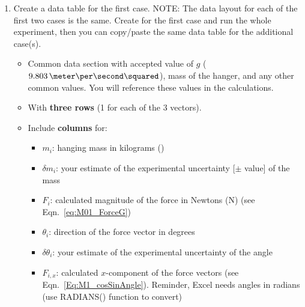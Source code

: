 \begin{enumerate}
\item Create a data table for the first case. NOTE: The data layout for each of the first two cases is the same. Create for the first case and run the whole experiment, then you can copy/paste the same data table for the additional case(s).
\begin{itemize}
    \item Common data section with accepted value of $g$ ($9.803\,\meter\per\second\squared$), mass of the hanger, and any other common values. You will reference these values in the calculations.
    \item With \textbf{three rows} (1 for each of the 3 vectors).%
    \item Include \textbf{columns} for:
    \begin{itemize}
        \item $m_i$: hanging mass in kilograms (\kilo\gram)
        \item $\delta m_i$: your estimate of the experimental uncertainty [$\pm$ value] of the mass
        \item $F_i$: calculated magnitude of the force in Newtons (N) (see Eqn.~\ref{eq:M01_ForceG})
        \item $\theta_i$: direction of the force vector in degrees
        \item $\delta \theta_i$: your estimate of the experimental uncertainty of the angle
        \item $F_{i,x}$: calculated $x$-component of the force vectors (see Eqn.~\ref{Eq:M1_cosSinAngle}). Reminder, Excel needs angles in radians (use RADIANS() function to convert)

\end{itemize}
\end{itemize}
\end{enumerate}
